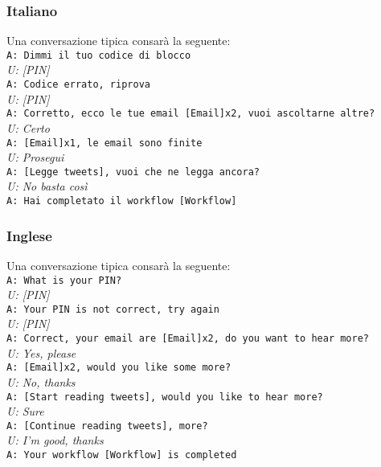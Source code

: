 \subsubsection{Italiano}
Una conversazione tipica consarà la seguente: \\
\newline
\texttt{A: Dimmi il tuo codice di blocco} \\
\textit{U: [PIN]} \\
\texttt{A: Codice errato, riprova} \\
\textit{U: [PIN]} \\
\texttt{A: Corretto, ecco le tue email [Email]x2, vuoi ascoltarne altre?}\\
\textit{U: Certo}\\
\texttt{A: [Email]x1, le email sono finite}\\
\textit{U: Prosegui}\\
\texttt{A: [Legge tweets], vuoi che ne legga ancora?}\\
\textit{U: No basta così}\\
\texttt{A: Hai completato il workflow [Workflow]}

\subsubsection{Inglese}
Una conversazione tipica consarà la seguente:\\
\newline
\texttt{A: What is your PIN?} \\
\textit{U: [PIN]} \\
\texttt{A: Your PIN is not correct, try again} \\
\textit{U: [PIN]} \\
\texttt{A: Correct, your email are [Email]x2, do you want to hear more?}\\
\textit{U: Yes, please} \\
\texttt{A: [Email]x2, would you like some more?} \\
\textit{U: No, thanks} \\
\texttt{A: [Start reading tweets], would you like to hear more?}\\
\textit{U: Sure} \\
\texttt{A: [Continue reading tweets], more?}\\
\textit{U: I'm good, thanks} \\
\texttt{A: Your workflow [Workflow] is completed}


